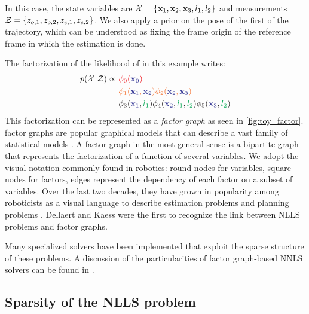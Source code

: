 In this case, the state variables are $\mathcal{X} = \{ {\bf x}_1, {\bf x}_2, {\bf x}_3, l_1, l_2\}$  and measurements $\mathcal{Z} = \{ z_{o,1}, z_{o,2}, z_{e,1}, z_{e,2}\}$.
We also apply a prior on the pose of the first \keyframe of the trajectory, which can be understood as fixing the frame origin of the reference 
frame in which the estimation is done.

The factorization of the likelihood of  in this example writes:
%
\begin{align}
    p(\cX | \cZ) \propto 
    ~&{\color{Red} \phi_0({\color{Blue} \bfx_{0}})} \\ 
    ~&{\color{Orange} \phi_1({\color{Blue} \bfx_1}, {\color{Blue} \bfx_2}) \phi_2({\color{Blue} \bfx_2}, {\color{Blue} \bfx_3})} \\ 
    ~&{\color{Black} \phi_3({\color{Blue} \bfx_1}, {\color{Green} l_1}) \phi_4({\color{Blue} \bfx_2}, {\color{Green} l_1}, {\color{Green} l_2}) \phi_5({\color{Blue} \bfx_3}, {\color{Green} l_2})} \\ 
\end{align}
%
This factorization can be represented as a \textit{factor graph} as seen in \ref{fig:toy_factor}. 
factor graphs are popular graphical models \cite{koller2009probabilistic} that can describe a vast family of statistical models \cite{loeliger2004introduction}.
A factor graph in the most general sense is a bipartite graph that represents the factorization of a function of several variables. 
We adopt the visual notation commonly found in robotics: round nodes for variables, square nodes for factors, edges represent the dependency 
of each factor on a subset of variables. Over the last two decades, they have grown in popularity among roboticists as a visual language to describe 
estimation problems \cite{dellaert2017factor} and planning problems \cite{dong2016motion}. Dellaert and Kaess \cite{dellaert2006square} were the first to
recognize the link between NLLS problems and factor graphs.

Many specialized solvers \cite{grisetti2011g2o, dellaert2012factor, ila2017slam++} have been implemented that exploit the sparse structure of these 
problems. A discussion of the particularities of factor graph-based NNLS solvers can be found in \cite{dellaert2017factor, sola2017course}.





\subsection{Sparsity of the NLLS problem}

